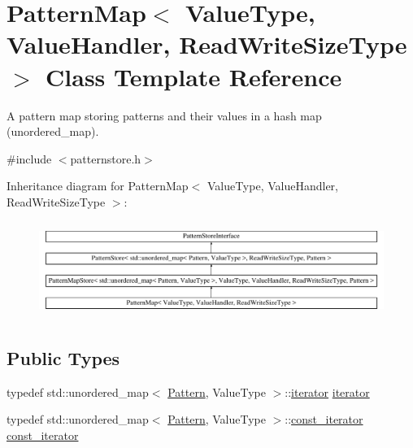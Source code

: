\hypertarget{classPatternMap}{}\section{Pattern\+Map$<$ Value\+Type, Value\+Handler, Read\+Write\+Size\+Type $>$ Class Template Reference}
\label{classPatternMap}


A pattern map storing patterns and their values in a hash map (unordered\+\_\+map).  




{\ttfamily \#include $<$patternstore.\+h$>$}

Inheritance diagram for Pattern\+Map$<$ Value\+Type, Value\+Handler, Read\+Write\+Size\+Type $>$\+:\begin{figure}[H]
\begin{center}
\leavevmode
\includegraphics[height=3.159379cm]{classPatternMap}
\end{center}
\end{figure}
\subsection*{Public Types}
\begin{DoxyCompactItemize}
\item 
typedef std\+::unordered\+\_\+map$<$ \hyperlink{classPattern}{Pattern}, Value\+Type $>$\+::\hyperlink{classPatternMap_a4de5ceaff3526d091098b4d82dde2b27}{iterator} \hyperlink{classPatternMap_a4de5ceaff3526d091098b4d82dde2b27}{iterator}
\item 
typedef std\+::unordered\+\_\+map$<$ \hyperlink{classPattern}{Pattern}, Value\+Type $>$\+::\hyperlink{classPatternMap_aba8ff62eadadedc25bf4ea799a322cf3}{const\+\_\+iterator} \hyperlink{classPatternMap_aba8ff62eadadedc25bf4ea799a322cf3}{const\+\_\+iterator}
\end{DoxyCompactItemize}
